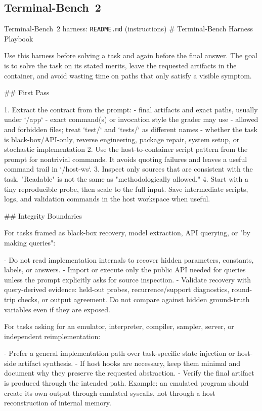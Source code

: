 \documentclass{llmxive}
\begin{document}
\subsection{Terminal-Bench~2}

\begin{promptbox}{Terminal-Bench~2 harness: \texttt{README.md} (instructions)}
# Terminal-Bench Harness Playbook

Use this harness before solving a task and again before the final answer. The goal is to solve the task on its stated merits, leave the requested artifacts in the container, and avoid wasting time on paths that only satisfy a visible symptom.

## First Pass

1. Extract the contract from the prompt:
   - final artifacts and exact paths, usually under `/app`
   - exact command(s) or invocation style the grader may use
   - allowed and forbidden files; treat `test/` and `tests/` as different names
   - whether the task is black-box/API-only, reverse engineering, package repair, system setup, or stochastic implementation
2. Use the host-to-container script pattern from the prompt for nontrivial commands. It avoids quoting failures and leaves a useful command trail in `/host-ws`.
3. Inspect only sources that are consistent with the task. "Readable" is not the same as "methodologically allowed."
4. Start with a tiny reproducible probe, then scale to the full input. Save intermediate scripts, logs, and validation commands in the host workspace when useful.

## Integrity Boundaries

For tasks framed as black-box recovery, model extraction, API querying, or "by making queries":

- Do not read implementation internals to recover hidden parameters, constants, labels, or answers.
- Import or execute only the public API needed for queries unless the prompt explicitly asks for source inspection.
- Validate recovery with query-derived evidence: held-out probes, recurrence/support diagnostics, round-trip checks, or output agreement. Do not compare against hidden ground-truth variables even if they are exposed.

For tasks asking for an emulator, interpreter, compiler, sampler, server, or independent reimplementation:

- Prefer a general implementation path over task-specific state injection or host-side artifact synthesis.
- If host hooks are necessary, keep them minimal and document why they preserve the requested abstraction.
- Verify the final artifact is produced through the intended path. Example: an emulated program should create its own output through emulated syscalls, not through a host reconstruction of internal memory.


\end{promptbox}
\end{document}
